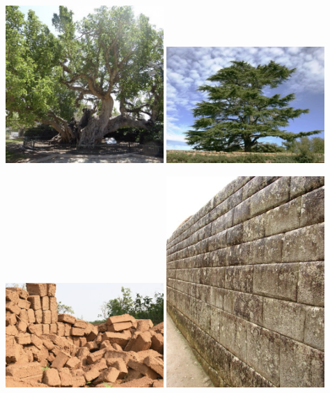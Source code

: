 \documentclass[11pt]{article}
\begin{document}
\vspace{1em}
\begin{center}
\includegraphics[width=0.45\textwidth]{sycamore.png}
\hspace{0.05\textwidth}
\includegraphics[width=0.45\textwidth]{lebanon-cedar.png}
\end{center}
\vspace{1em}

\begin{center}
\includegraphics[width=0.45\textwidth]{mud-bricks.png}
\hspace{0.05\textwidth}
\includegraphics[width=0.45\textwidth]{ashlar-stones.png}
\end{center}
\vspace{1em}
\end{document}

